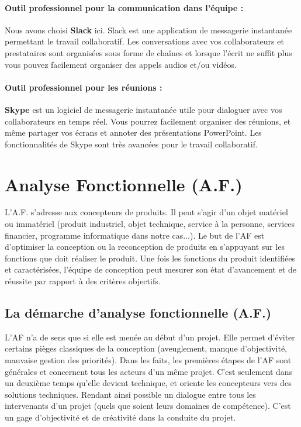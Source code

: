 \paragraph{Outil professionnel pour la communication dans l’équipe : } Nous avons choisi \textbf{Slack} ici. Slack est une application de messagerie instantanée permettant le travail collaboratif. Les conversations avec vos collaborateurs et prestataires sont organisées sous forme de chaînes et lorsque l’écrit ne suffit plus vous pouvez facilement organiser des appels audios et/ou vidéos.
 \paragraph{Outil professionnel pour les réunions : } \textbf{Skype} est un logiciel de messagerie instantanée utile pour dialoguer avec vos collaborateurs en temps réel. Vous pourrez facilement organiser des réunions, et même partager vos écrans et annoter des présentations PowerPoint. Les fonctionnalités de Skype sont très avancées pour le travail collaboratif.
\section{Analyse Fonctionnelle (A.F.)}
L’A.F. s’adresse aux concepteurs de produits. Il peut s’agir d’un objet matériel ou immatériel (produit industriel, objet technique, service à la personne, services financier, programme informatique dans notre cas...). Le but de l’AF est d’optimiser la conception ou la reconception de produits en s’appuyant sur les fonctions que doit réaliser le produit. Une fois les fonctions du produit identifiées et caractérisées, l’équipe de conception peut mesurer son état d’avancement et de réussite par rapport à des critères objectifs.

\subsection{La démarche d’analyse fonctionnelle (A.F.)}
L’AF n’a de sens que si elle est menée au début d’un projet. Elle permet d’éviter certains pièges classiques de la conception (aveuglement, manque d’objectivité, mauvaise gestion des priorités). Dans les faits, les premières étapes de l’AF sont générales et concernent tous les acteurs d’un même projet. C’est seulement dans un deuxième temps qu'elle devient technique, et oriente les concepteurs vers des solutions techniques. Rendant ainsi possible un dialogue entre tous les intervenants d’un projet (quels que soient leurs domaines de compétence). C’est un gage d’objectivité et de créativité dans la conduite du projet.

